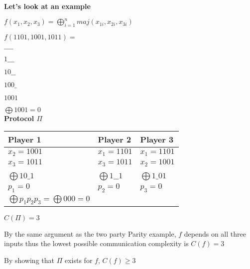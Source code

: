 \documentclass[12pt]{article}
\begin{document}
\textbf{Let's look at an example}
\\

\par{$f(x_{1}, x_{2}, x_{3}) = \bigoplus_{i = 1}^{n} maj(x_{1i}, x_{2i}, x_{3i})$}
\\

\par{$f(1101, 1001, 1011) = $}
\par{$\_ \_ \_ \_$}
\par{$1 \_ \_ \_$}
\par{$1 0 \_ \_$}
\par{$1 0 0 \_$}
\par{$1 0 0 1$}
\par{$\bigoplus 1001 = 0$}
\\

\textbf{Protocol $\Pi$}
\\

\begin{center}
  \begin{tabular}{ |m{10em}|m{10em}|m{10em}| } 
    \hline
    Player 1                                        & Player 2              & Player 3 \\ [0.5ex] 
    \hline
    $x_{2}=1001$                                    & $x_{1}=1101$          & $x_{1}=1101$         \\
    $x_{3}=1011$                                    & $x_{3}=1011$          & $x_{2}=1001$         \\
                                                    &                       &                      \\
    $\bigoplus 1 0 \_ 1$                            & $\bigoplus 1 \_ \_ 1$ & $\bigoplus 1 \_ 0 1$ \\
    $p_{1} = 0$                                     & $p_{2} = 0$           & $p_{3} = 0$          \\
    \hline
    $\bigoplus p_{1}p_{2}p_{3} = \bigoplus 000 = 0$ &                       &                      \\
    \hline
  \end{tabular}
\end{center}

\par{$C(\Pi) = 3$}
\\

\par{By the same argument as the two party Parity example, $f$ depends on all three inputs thus the lowest possible
communication complexity is $C(f) = 3$}
\\

\par{By showing that $\Pi$ exists for $f$, $C(f) \geq 3$}
\end{document}

